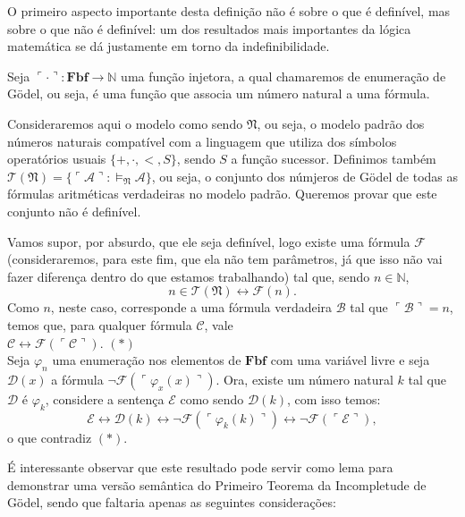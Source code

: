 \documentclass[11pt,a4paper]{article}
\theoremstyle{definition}
\begin{document}
O primeiro aspecto importante desta definição não é sobre o que é definível, mas sobre o que não é definível: um dos resultados mais importantes da lógica matemática se dá justamente em torno da indefinibilidade. 

Seja $\ulcorner \cdot \urcorner : \textbf{Fbf}\rightarrow \mathbb{N}$ uma função injetora, a qual chamaremos de enumeração de Gödel, ou seja, é uma função que associa um número natural a uma fórmula.

Consideraremos aqui o modelo como sendo $\mathfrak{N}$, ou seja, o modelo padrão dos números naturais compatível com a linguagem que utiliza dos símbolos operatórios usuais $\{ +, \cdot, <, S\}$, sendo $S$ a função sucessor. Definimos também $\mathscr{T}(\mathfrak{N})=\{\ulcorner \mathscr{A} \urcorner  : \vDash_{\mathfrak{N}} \mathscr{A} \}$, ou seja, o conjunto dos númjeros de Gödel de todas as fórmulas aritméticas verdadeiras no modelo padrão. Queremos provar que este conjunto não é definível. 

Vamos supor, por absurdo, que ele seja definível, logo existe uma fórmula $\mathscr{F}$ (consideraremos, para este fim, que ela não tem parâmetros, já que isso não vai fazer diferença dentro do que estamos trabalhando) tal que, sendo $n\in \mathbb{N}$, $$n\in \mathscr{T}(\mathfrak{N})\leftrightarrow \mathscr{F}(n).$$ Como $n$, neste caso, corresponde a uma fórmula verdadeira $\mathscr{B}$ tal que $\ulcorner \mathscr{B} \urcorner=n$, temos que, para qualquer fórmula $\mathscr{C}$, vale \\

\hfill{$\mathscr{C} \leftrightarrow \mathscr{F}(\ulcorner \mathscr{C} \urcorner)$.} \hfill{$(*)$}  \\

Seja $\varphi _n$ uma enumeração nos elementos de $\textbf{Fbf}$ com uma variável livre e seja $\mathscr{D}(x)$ a fórmula $\neg \mathscr{F}(\ulcorner \varphi_x (x) \urcorner)$. Ora, existe um número natural $k$ tal que $\mathscr{D}$ é $\varphi_k$, considere a sentença $\mathscr{E}$ como sendo $\mathscr{D}(k)$, com isso temos: $$\mathscr{E} \leftrightarrow \mathscr{D}(k) \leftrightarrow \neg \mathscr{F}(\ulcorner \varphi_k (k) \urcorner)  \leftrightarrow \neg \mathscr{F}(\ulcorner \mathscr{E} \urcorner),$$ o que contradiz $(*)$.

É interessante observar que este resultado pode servir como lema para demonstrar uma versão semântica do Primeiro Teorema da Incompletude de Gödel, sendo que faltaria apenas as seguintes considerações: \\
\end{document}
